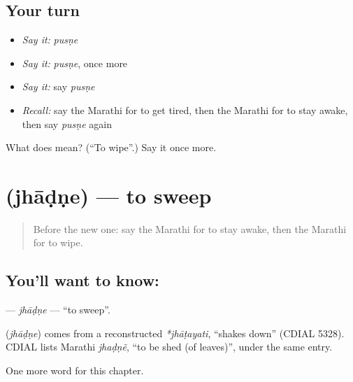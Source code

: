 \subsection*{Your turn}
\begin{itemize}
\raggedright
  \item \emph{Say it:} \emph{pusṇe}
  \item \emph{Say it:} \emph{pusṇe}, once more
  \item \emph{Say it:} say \emph{pusṇe}
  \item \emph{Recall:} say the Marathi for to get tired, then the Marathi for to stay awake, then say \emph{pusṇe} again
\end{itemize}

\begin{tcolorbox}[breakable,colback=teal!4,colframe=teal!35!black,title={Before you move on}]
What does  mean? (\textquotedblleft{}To wipe\textquotedblright{}.) Say it once more.
\end{tcolorbox}
\section[\texorpdfstring{\mr{झाडणे} (jhāḍṇe)}{झाडणे (jhāḍṇe)}]{ (jhāḍṇe) — to sweep}

\label{lesson:MR-C158-jhadne}



\begin{quote}
Before the new one: say the Marathi for to stay awake, then the Marathi for to wipe.
\end{quote}

\subsection*{You'll want to know: }
\textbf{} — \emph{jhāḍṇe} — \textquotedblleft{}to sweep\textquotedblright{}.

\begin{cousinweb}
\textbf{} (\emph{jhāḍṇe}) comes from a reconstructed \emph{*jhāṭayati}, \textquotedblleft{}shakes down\textquotedblright{} (CDIAL 5328). CDIAL lists Marathi \emph{jhaḍṇẽ}, \textquotedblleft{}to be shed (of leaves)\textquotedblright{}, under the same entry.
\end{cousinweb}

\begin{grammarlens}[title={What you've built}]
One more word for this chapter.
\end{grammarlens}


